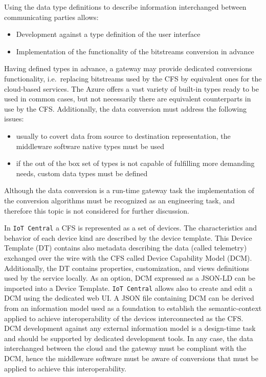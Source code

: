 \documentclass{jacsart}
\providecommand{\tightlist} { \setlength{\itemsep}{0pt}\setlength{\parskip}{0pt}}
\begin{document}
Using the data type definitions to describe information interchanged
between communicating parties allows:

\begin{itemize}
      \tightlist
      \item
            Development against a type definition of the user interface
      \item
            Implementation of the functionality of the bitstreams conversion in
            advance
\end{itemize}

Having defined types in advance, a gateway may provide dedicated conversions functionality, i.e.~replacing bitstreams used by the CFS by equivalent ones for the cloud-based services. The Azure offers a vast variety of built-in types ready to be used in common cases, but not necessarily there are equivalent counterparts in use by the CFS. Additionally, the data conversion must address the following issues:

\begin{itemize}
      \tightlist
      \item
            usually to covert data from source to destination representation, the
            middleware software native types must be used
      \item
            if the out of the box set of types is not capable of fulfilling more
            demanding needs, custom data types must be defined
\end{itemize}

Although the data conversion is a run-time gateway task the
implementation of the conversion algorithms must be recognized as an
engineering task, and therefore this topic is not considered for further
discussion.

In \texttt{IoT\ Central} a CFS is represented as a set
of devices. The characteristics and behavior of each device kind are
described by the device template. This Device Template (DT) contains
also metadata describing the data (called telemetry) exchanged over the
wire with the CFS called Device Capability Model
(DCM). Additionally, the DT contains properties, customization, and
views definitions used by the service locally. As an option, DCM
expressed as a JSON-LD can be imported into a Device Template.
\texttt{IoT\ Central} allows also to create and edit a DCM using the
dedicated web UI. A JSON file containing DCM can be derived from an
information model used as a foundation to establish the semantic-context
applied to achieve interoperability of the devices interconnected as the
CFS. DCM development against any external information
model is a design-time task and should be supported by dedicated
development tools. In any case, the data interchanged between the cloud
and the gateway must be compliant with the DCM, hence the middleware
software must be aware of conversions that must be applied to achieve
this interoperability.
\end{document}
